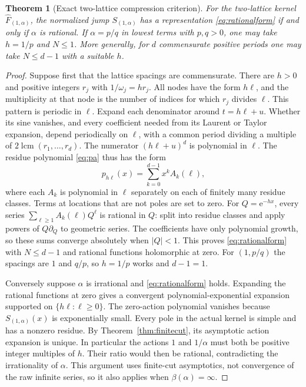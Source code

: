 \documentclass[11pt,a4paper]{article}
\numberwithin{equation}{section}
\newtheorem{theorem}{Theorem}[section]
\theoremstyle{definition}
\theoremstyle{remark}
\newcommand{\e}{\mathrm e}
\begin{document}
\begin{theorem}[Exact two-lattice compression criterion]
\label{thm:rational}
For the two-lattice kernel $\widehat F_{(1,\alpha)}$, the normalized jump
$S_{(1,\alpha)}$ has a representation \eqref{eq:rationalform} if and only
if $\alpha$ is rational. If $\alpha=p/q$ in lowest terms with $p,q>0$,
one may take $h=1/p$ and $N\le1$.
More generally, for $d$ commensurate positive periods one may take
$N\le d-1$ with a suitable $h$.
\end{theorem}
\begin{proof}
Suppose first that the lattice spacings are commensurate. There are
$h>0$ and positive integers $r_j$ with $1/\omega_j=hr_j$. All nodes have
the form $h\ell$, and the multiplicity at that node is the number of
indices for which $r_j$ divides $\ell$. This pattern is periodic in
$\ell$.
Expand each denominator around $t=h\ell+u$. Whether its sine vanishes,
and every coefficient needed from its Laurent or Taylor expansion,
depend periodically on $\ell$, with a common period dividing a multiple
of $2\operatorname{lcm}(r_1,\ldots,r_d)$. The numerator $(h\ell+u)^d$
is polynomial in $\ell$. The residue polynomial \eqref{eq:pa} thus has
the form
\[
 p_{h\ell}(x)=\sum_{k=0}^{d-1}x^k A_k(\ell),
\]
where each $A_k$ is polynomial in $\ell$ separately on each of finitely
many residue classes. Terms at locations that are not poles are set to
zero. For $Q=\e^{-hx}$, every series
$\sum_{\ell\ge1}A_k(\ell)Q^\ell$ is rational in $Q$: split into residue
classes and apply powers of $Q\partial_Q$ to geometric series.
The coefficients have only polynomial growth, so these sums converge
absolutely when $|Q|<1$. This proves \eqref{eq:rationalform} with
$N\le d-1$ and rational functions holomorphic at zero.
For $(1,p/q)$ the spacings are $1$ and $q/p$, so $h=1/p$ works and
$d-1=1$.

Conversely suppose $\alpha$ is irrational and
\eqref{eq:rationalform} holds. Expanding the rational functions at zero
gives a convergent polynomial-exponential expansion supported on
$\{h\ell:\ell\ge0\}$. The zero-action polynomial vanishes because
$S_{(1,\alpha)}(x)$ is exponentially small. Every pole in the actual
kernel is simple and has a nonzero residue. By
Theorem~\ref{thm:finitecut}, its asymptotic action expansion is unique.
In particular the actions $1$ and $1/\alpha$ must both be positive integer
multiples of $h$. Their ratio would then be rational, contradicting the
irrationality of $\alpha$. This argument uses finite-cut asymptotics,
not convergence of the raw infinite series, so it also applies when
$\beta(\alpha)=\infty$.
\end{proof}
\end{document}
